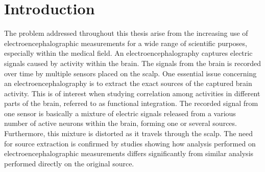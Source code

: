 \chapter*{Introduction}\label{ch:introduction}
%
%
The problem addressed throughout this thesis arise from the increasing use of electroencephalographic measurements for a wide range of scientific purposes, especially within the medical field. 
An electroencephalography captures electric signals caused by activity within the brain. The signals from the brain is recorded over time by multiple sensors placed on the scalp.
One essential issue concerning an electroencephalography is to  
extract the exact sources of the captured brain activity. This is of interest when studying correlation among activities in different parts of the brain, referred to as functional integration.  
The recorded signal from one sensor is basically a mixture of electric signals released from a various number of active neurons within the brain, forming one or several sources. 
Furthermore, this mixture is distorted as it travels through the scalp. The need for source extraction is confirmed by studies showing how analysis performed on electroencephalographic measurements differs significantly from similar analysis performed directly on the original source\cite{Friston2002}.

